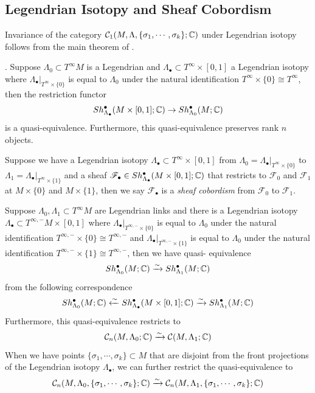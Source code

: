 \subsection*{Legendrian Isotopy and Sheaf Cobordism}
Invariance of the category $\mathcal{C}_1(M,\Lambda, \{\sigma_1,\cdots,\sigma_k\};\mathbb{C})$ under Legendrian isotopy follows from the main theorem of \cite{guillermou2012sheaf}.
\begin{theorem}\label{GKS}
\cite{guillermou2012sheaf}. Suppose $\Lambda_0 \subset T^{\infty}M$ is a Legendrian and $\Lambda_\bullet \subset T^{\infty} \times [0,1]$ a Legendrian isotopy where $\Lambda_\bullet|_{T^{\infty} \times \{0\}}$ is equal to $\Lambda_0$ under the natural identification $T^{\infty} \times \{0\} \cong T^{\infty}$, then the restriction functor 
\[
Sh^\bullet_{\Lambda_\bullet}(M\times [0,1];\mathbb{C}) \rightarrow Sh^\bullet_{\Lambda_0}(M;\mathbb{C})
\]
is a quasi-equivalence. Furthermore, this quasi-equivalence preserves rank $n$ objects.
\end{theorem}

\begin{definition}
Suppose we have a Legendrian isotopy $\Lambda_\bullet\subset T^{\infty} \times [0,1]$ from $\Lambda_0 = \Lambda_\bullet|_{T^{\infty} \times \{0\}}$ to $\Lambda_1 = \Lambda_\bullet|_{T^{\infty} \times \{1\}}$ and a sheaf $\mathscr{F}_\bullet \in Sh^\bullet_{\Lambda_\bullet}(M\times [0,1];\mathbb{C})$ that restricts to $\mathscr{F}_0$ and $\mathscr{F}_1$ at $M\times\{0\}$ and $M\times\{1\}$, then we say $\mathscr{F}_\bullet$ is a \emph{sheaf cobordism} from $\mathscr{F}_0$ to $\mathscr{F}_1$.
\end{definition}

\begin{definition}
Suppose $\Lambda_0,\Lambda_1 \subset T^{\infty}M$ are Legendrian links and there is a Legendrian isotopy $\Lambda_\bullet \subset T^{\infty,-}M \times [0,1]$ where $\Lambda_\bullet|_{T^{\infty,-}\times \{0\}}$ is equal to $\Lambda_0$ under the natural identification $T^{\infty,-}\times \{0\} \cong T^{\infty,-}$ and $\Lambda_\bullet|_{T^{\infty,-}\times \{1\}}$ is equal to $\Lambda_0$ under the natural identification $T^{\infty,-}\times \{1\} \cong T^{\infty,-}$, then we have quasi- equivalence 
\[
Sh^\bullet_{\Lambda_0}(M;\mathbb{C}) \xrightarrow{\sim} Sh^\bullet_{\Lambda_1}(M;\mathbb{C})
\]
from the following correspondence
\[
Sh^\bullet_{\Lambda_0}(M;\mathbb{C}) \xleftarrow{\sim} Sh^\bullet_{\Lambda_\bullet}(M\times [0,1];\mathbb{C}) \xrightarrow{\sim} Sh^\bullet_{\Lambda_1}(M;\mathbb{C})
\]
Furthermore, this quasi-equivalence restricts to 
\[
\mathcal{C}_n(M,\Lambda_0;\mathbb{C}) \xrightarrow{\sim} \mathcal{C}(M,\Lambda_1;\mathbb{C})
\]
When we have points $\{\sigma_1,\cdots,\sigma_k\}\subset M$ that are disjoint from the front projections of the Legendrian isotopy $\Lambda_\bullet$, we can further restrict the quasi-equivalence to
\[
\mathcal{C}_n(M,\Lambda_0,\{\sigma_1,\cdots,\sigma_k\};\mathbb{C}) \xrightarrow{\sim} \mathcal{C}_n(M,\Lambda_1,\{\sigma_1,\cdots,\sigma_k\};\mathbb{C})
\]
\end{definition}

